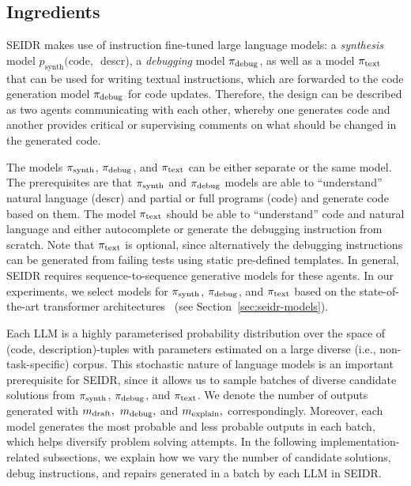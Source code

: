 \subsection{Ingredients}
\label{sec:seidr-ingredients}

SEIDR makes use of instruction fine-tuned large language models: a \emph{synthesis} model $p_{\text{synth}}(\text{code, }$ descr), a \emph{debugging} model $ \pi_\text{debug} $, as well as a model $ \pi_\text{text} $ that can be used for writing textual instructions, which are forwarded to the code generation model $ \pi_\text{debug} $ for code updates. 
Therefore, the design can be described as two agents communicating with each other, whereby one generates code and another provides critical or supervising comments on what should be changed in the generated code. 

The models $ \pi_\text{synth} $, $ \pi_\text{debug} $, and $ \pi_\text{text} $ can be either separate or the same model.
The prerequisites are that $ \pi_\text{synth} $ and $ \pi_\text{debug} $ models are able to ``understand'' natural language (descr) and partial or full programs (code) and generate code based on them. 
The model $ \pi_\text{text} $ should be able to ``understand'' code and natural language and either autocomplete or generate the debugging instruction from scratch. 
Note that $ \pi_\text{text} $ is optional, since alternatively the debugging instructions can be generated from failing tests using static pre-defined templates.
In general, SEIDR requires sequence-to-sequence generative models for these agents. 
In our experiments, we select models for $ \pi_\text{synth} $, $ \pi_\text{debug} $, and $ \pi_\text{text} $ based on the state-of-the-art transformer architectures~\cite{vaswaniAttentionAllYou2023} 
(see Section~\ref{sec:seidr-models}). 

Each LLM is a highly parameterised probability distribution over the space of (code, description)-tuples with parameters estimated on a large diverse (i.e., non-task-specific) corpus.
This stochastic nature of language models is an important prerequisite for SEIDR, since it allows us to sample batches of diverse candidate solutions from $ \pi_\text{synth} $, $ \pi_\text{debug} $, and $ \pi_\text{text} $. 
We denote the number of outputs generated with $m_\text{draft},$ $m_\text{debug},$ and $m_\text{explain},$ correspondingly.
Moreover, each model generates the most probable and less probable outputs in each batch, which helps diversify problem solving attempts. 
In the following implementation-related subsections, we explain how we vary the number of candidate solutions, debug instructions, and repairs generated in a batch by each LLM in SEIDR.

